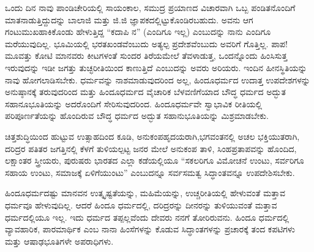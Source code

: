 ಒಂದು ದಿನ ನಾವು ಪಾಂಡಿಚೇರಿಯಲ್ಲಿ ಸಾಯಂಕಾಲ, ಸಮುದ್ರ ಪ್ರಯಾಣದ ವಿಚಾರವಾಗಿ ಒಬ್ಬ ಪಂಡಿತನೊಂದಿಗೆ ಮಾತನಾಡುತ್ತಿದ್ದುದನ್ನು ಬಾಲಾಜಿ ಮತ್ತು ಜಿ.ಜಿ ಜ್ಞಾಪಕದಲ್ಲಿಟ್ಟುಕೊಂಡಿರಬಹುದು. ಅವನು ಆಗ ಗಂಟುಮುಖಹಾಕಿಕೊಂಡು ಹೇಳುತ್ತಿದ್ದ “ಕದಾಪಿ ನ” (ಎಂದಿಗೂ ಇಲ್ಲ) ಎಂಬುದನ್ನು ನಾನು ಎಂದಿಗೂ ಮರೆಯುವುದಿಲ್ಲ. ಭೂಮಿಯಲ್ಲಿ ಭರತಖಂಡವೆಂಬುದು ಅತ್ಯಲ್ಪ ಪ್ರದೇಶವೆಂಬುದು ಅವರಿಗೆ ಗೊತ್ತಿಲ್ಲ. ಪಾಪ!ಮೂವತ್ತು ಕೋಟಿ ಮಾನವರು ಕೀಟಗಳಂತೆ ಸುಂದರ ತಿರೆಯಮೇಲೆ ತೆವಳಾಡುತ್ತ, ಒಂದನ್ನೊಂದು ಹಿಂಸಿಸುತ್ತ ಇರುವುದನ್ನು ಇಡೀ ಜಗತ್ತು ತುಚ್ಛರೀತಿಯಿಂದ ಕಾಣುತ್ತಿದೆ ಎಂಬುದನ್ನು ಅವರು ಅರಿಯರು. ಇಂದಿನ ಹೀನಸ್ಥಿತಿಯನ್ನು ನಾವು ಹೋಗಲಾಡಿಸಬೇಕು. ಧರ್ಮವನ್ನು ನಾಶಮಾಡುವುದರಿಂದ ಅಲ್ಲ, ಹಿಂದೂಧರ್ಮದ ಉದಾತ್ತ ಉಪದೇಶಗಳನ್ನು ಅನುಷ್ಠಾನಕ್ಕೆ ತರುವುದರಿಂದ ಮತ್ತು ಹಿಂದೂಧರ್ಮದ ವೈಚಾರಿಕ ಬೆಳವಣಿಗೆಯಾದ ಬೌದ್ಧ ಧರ್ಮದ ಅದ್ಭುತ ಸಹಾನೂಭೂತಿಯನ್ನು ಅದರೊಂದಿಗೆ ಸೇರಿಸುವುದರಿಂದ. ಹಿಂದೂಧರ್ಮವೇ ಸ್ವಾಭಾವಿಕ ರೀತಿಯಲ್ಲಿ ಪರಿಪೂರ್ಣತೆಯನ್ನು ಹೊಂದಿರುವ ಬೌದ್ಧ ಧರ್ಮದ ಅದ್ಭುತ ಸಹಾನುಭೂತಿಯನ್ನು ಮಿಶ್ರಮಾಡಬೇಕು.

ಚಿತ್ತಶುದ್ಧಿಯಿಂದ ಹುಟ್ಟುವ ಉತ್ಸಾಹದಿಂದ ಕೂಡಿ, ಅನುಕಂಪಹೃದಯರಾಗಿ,\break ಭಗವಂತನಲ್ಲಿ ಅಚಲ ಭಕ್ತಿಯುತರಾಗಿ, ದರಿದ್ರರ ಪತಿತರ ಜಗತ್ತಿನಲ್ಲಿ ಕೆಳಗೆ ತುಳಿಯಲ್ಪಟ್ಟ ಜನರ ಮೇಲೆ ಅನುಕಂಪ ತಾಳಿ, ಸಿಂಹಪ್ರತಾಪವನ್ನು ಹೊಂದಿದ, ಲಕ್ಷಾಂತರ ಸ್ತ್ರೀಯರು, ಪುರುಷರು ಭಾರತದ ಎಲ್ಲಾ ಕಡೆಯಲ್ಲಿಯೂ “ಸಕಲರಿಗೂ ವಿಮೋಚನೆ ಉಂಟು, ಸರ್ವರಿಗೂ ಸಹಾಯ ಉಂಟು, ಸಮಾಜಕ್ಕೆ ಏಳಿಗೆಯುಂಟು” ಎಂಬುದನ್ನೂ ಸರ್ವಸಮತ್ವ ಸಿದ್ಧಾಂತವನ್ನೂ ಉಪದೇಶಿಸಬೇಕು.

ಹಿಂದೂಧರ್ಮದಷ್ಟು ಮಾನವನ ಉತ್ಕೃಷ್ಟತೆಯನ್ನು, ಮಹಿಮೆಯನ್ನು, ಉಚ್ಚರೀತಿಯಲ್ಲಿ ಹೇಳುವಂತೆ ಮತ್ತಾವ ಧರ್ಮವೂ ಹೇಳುವುದಿಲ್ಲ. ಆದರೆ ಹಿಂದೂ ಧರ್ಮದಲ್ಲಿ, ದರಿದ್ರರನ್ನು ದೀನರನ್ನು ತುಳಿಯುವಂತೆ ಮತ್ತಾವ ಧರ್ಮದಲ್ಲಿಯೂ ಇಲ್ಲ. ಇದು ಧರ್ಮದ ತಪ್ಪಲ್ಲವೆಂದು ದೇವರು ನನಗೆ ತೋರಿರುವನು. ಹಿಂದೂ ಧರ್ಮದಲ್ಲಿ ವ್ಯಾವಹಾರಿಕ, ಪಾರಮಾರ್ಥಿಕ ಎಂಬ ನಾನಾ ಹಿಂಸೆಗಳನ್ನು ಕೊಡುವ ಸಿದ್ಧಾಂತಗಳನ್ನು ಪ್ರಚಾರಕ್ಕೆ ತಂದ ಕಪಟಿಗಳು ಮತ್ತು ಆಷಾಢಭೂತಿಗಳೇ ಅಪರಾಧಿಗಳು.

